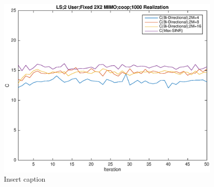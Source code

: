 \documentclass[11pt, oneside]{article}   	%
\begin{document}
\begin{figure}[bp!]
    \centering
    \centerline{\includegraphics[width=220mm]{coop}}
    \caption{Insert caption}
\end{figure} 

 
\end{document}
